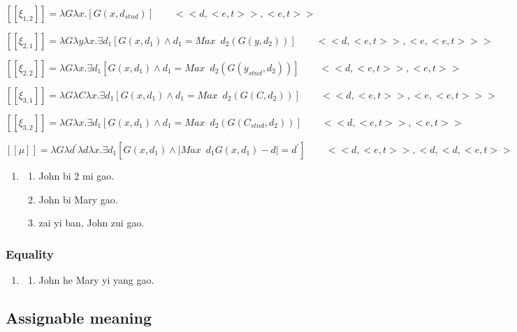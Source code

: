 \documentclass{ctexart}
\begin{document}
$[\![\xi_{1,2}]\!]=\lambda G \lambda x .[G(x,d_{stnd})] \qquad <<d,<e,t>>,<e,t>>$

$[\![\xi_{2,1}]\!]=\lambda G \lambda y \lambda x . \exists d_1 [G(x,d_1) \land d_1=Max \enspace d_2(G(y,d_2))] \qquad <<d,<e,t>>,<e,<e,t>>>$

$[\![\xi_{2,2}]\!]=\lambda G \lambda x . \exists d_1 [G(x,d_1) \land d_1=Max \enspace d_2(G(y_{stnd},d_2))] \qquad <<d,<e,t>>,<e,t>>$

$[\![\xi_{3,1}]\!]=\lambda G \lambda C \lambda x . \exists d_1 [G(x,d_1) \land d_1=Max \enspace d_2(G(C,d_2))] \qquad <<d,<e,t>>,<e,<e,t>>>$

$[\![\xi_{3,2}]\!]=\lambda G \lambda x . \exists d_1 [G(x,d_1) \land d_1=Max \enspace d_2(G(C_{stnd},d_2))] \qquad <<d,<e,t>>,<e,t>>$


$[\![\mu]\!]=\lambda G \lambda d^{\prime} \lambda d \lambda x. \exists d_1[G(x, d_1) \land | Max \enspace d_1 G(x,d_1)-d | =d^{\prime}] \qquad <<d,<e,t>>, <d,<d,<e,t>>>>$





\begin{enumerate}[resume]
    \item
    \begin{enumerate}[ref=(\arabic{enumi}\alph*)]
        \item John bi 2 mi gao.
        \item John bi Mary gao.
        \item zai yi ban, John zui gao.
    \end{enumerate}
\end{enumerate}

\subsubsection{Equality}

\begin{enumerate}[resume]
    \item
    \begin{enumerate}[ref=(\arabic{enumi}\alph*)]
        \item John he Mary yi yang gao.
    \end{enumerate}
\end{enumerate}

\subsection{Assignable meaning}
\end{document}
